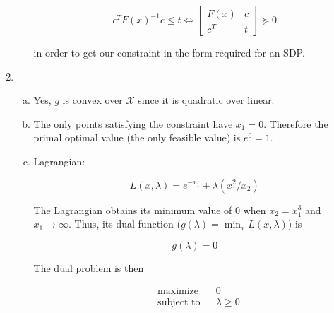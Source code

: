 \begin{enumerate}[(1)]
\begin{enumerate}[(a)]
\[
c^TF(x)^{-1}c  \leq t \iff  \begin{bmatrix}
    F(x)      & c \\
    c^T & t
\end{bmatrix} \succeq 0 
\]

in order to get our constraint in the form required for an SDP.

\end{enumerate}


\item

\begin{enumerate}[(a)]

\item Yes, \(g\) is convex over \(\mathcal{X}\) since it is quadratic over linear.

\item  The only points satisfying the constraint have \(x_1 = 0\). Therefore the primal optimal value (the only feasible value) is \(e^0 = \boxed{1}\). 

\item Lagrangian:

\[
L(x, \lambda) = e^{-x_1} + \lambda (x_1^2/x_2)
\]

The Lagrangian obtains its minimum value of 0 when \(x_2 = x_1^3\) and \(x_1 \to \infty\). Thus, its dual function (\( g(\lambda) = \min_x L(x, \lambda)\)) is


\[
g(\lambda) = 0
\]
%
%

The dual problem is then

\[
\boxed{
\begin{aligned}
& {\text{maximize}}
& & 0 \\
& \text{subject to}
& & \lambda \geq 0
\end{aligned}}
\]


\end{enumerate}
\end{enumerate}
